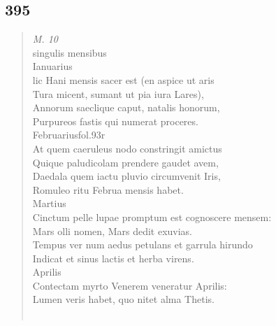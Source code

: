 \documentclass[11pt, a4paper]{report}
\begin{document}
            \subsection*{395}
      \begin{verse}
      \textit{M. 10} \\ singulis mensibus \\ Ianuarius \\ lic Hani mensis sacer est (en aspice ut aris \\ Tura micent, sumant ut pia iura Lares), \\ Annorum saeclique caput, natalis honorum, \\ Purpureos fastis qui numerat proceres. \\ Februariusfol.93r \\ At quem caeruleus nodo constringit amictus \\ Quique paludicolam prendere gaudet avem, \\ Daedala quem iactu pluvio circumvenit Iris, \\ Romuleo ritu Februa mensis habet. \\ Martius \\ Cinctum pelle lupae promptum est cognoscere mensem: \\ Mars olli nomen, Mars dedit exuvias. \\ Tempus ver \lbrack num \rbrack  aedus petulans et garrula hirundo \\ Indicat et sinus lactis et herba virens. \\ Aprilis \\ Contectam myrto Venerem veneratur Aprilis: \\ Lumen veris habet, quo nitet alma Thetis. \\ 
        ﻿\pagebreak 
    
      \end{verse}
  
\end{document}
